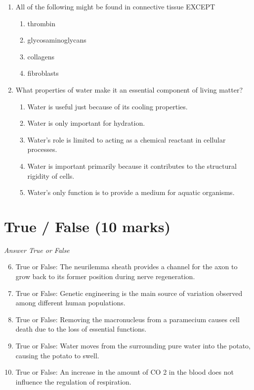 \documentclass[12pt]{article}
\begin{document}
\begin{enumerate}[label=\arabic*.]
\begin{enumerate}[label=(\alph*)]
    \item the primary RNA transcript (after splicing) from the original DNA
    \item a single strand of the original DNA segment after a duplication mutation
\end{enumerate}
\item All of the following might be found in connective tissue EXCEPT
\begin{enumerate}[label=(\alph*)]
    \item thrombin
    \item glycosaminoglycans
    \item collagens
    \item fibroblasts
\end{enumerate}
\item What properties of water make it an essential component of living matter?
\begin{enumerate}[label=(\alph*)]
    \item Water is useful just because of its cooling properties.
    \item Water is only important for hydration.
    \item Water's role is limited to acting as a chemical reactant in cellular processes.
    \item Water is important primarily because it contributes to the structural rigidity of cells.
    \item Water's only function is to provide a medium for aquatic organisms.
\end{enumerate}
\end{enumerate}

\section*{True / False (10 marks)}
\textit{Answer True or False}
\begin{enumerate}[label=\arabic*.]
\setcounter{enumi}{5}
\item True or False: The neurilemma sheath provides a channel for the axon to grow back to its former position during nerve regeneration.
\item True or False: Genetic engineering is the main source of variation observed among different human populations.
\item True or False: Removing the macronucleus from a paramecium causes cell death due to the loss of essential functions.
\item True or False: Water moves from the surrounding pure water into the potato, causing the potato to swell.
\item True or False: An increase in the amount of CO 2 in the blood does not influence the regulation of respiration.
\end{enumerate}
\end{document}
